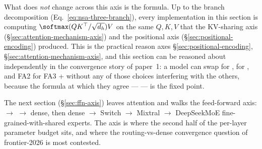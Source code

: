 What does \emph{not} change across this axis is the formula. Up to the
 branch decomposition (Eq.~\eqref{eq:nsa-three-branch}), every
implementation in this section is computing
$\softmax(QK^\top/\sqrt{d_h})V$ on the same $Q, K, V$ that the
KV-sharing axis (\S\ref{sec:attention-mechanism-axis}) and the
positional axis (\S\ref{sec:positional-encoding}) produced. This is the
practical reason axes \S\ref{sec:positional-encoding},
\S\ref{sec:attention-mechanism-axis}, and this section can be reasoned
about independently in the convergence story of paper~1: a model can
swap  for ,  for , and FA2 for FA3 +  without any of
those choices interfering with the others, because the formula at
which they agree ---  --- is the fixed point.

The next section (\S\ref{sec:ffn-axis}) leaves attention and walks the
feed-forward axis:  $\to$  $\to$  dense, then dense
$\to$ Switch $\to$ Mixtral $\to$ DeepSeekMoE fine-grained-with-shared
experts. The  axis is where the second half of the per-layer
parameter budget sits, and where the routing-vs-dense convergence
question of frontier-2026 is most contested.
